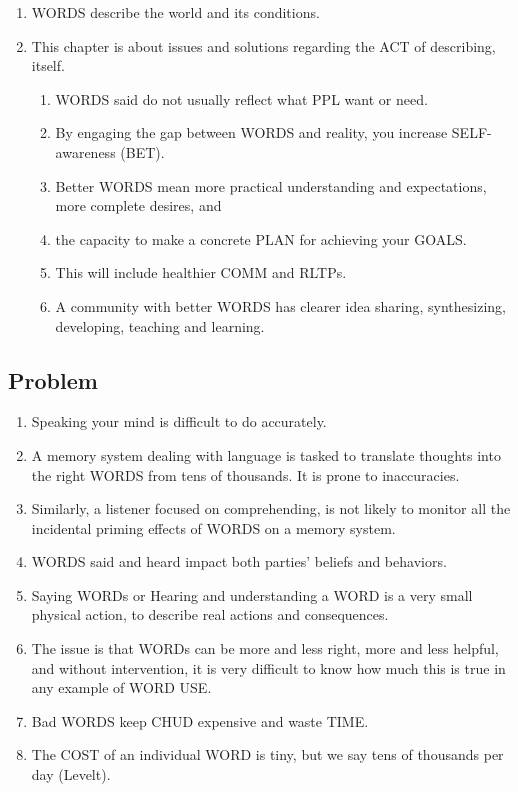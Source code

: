 \documentclass[
]{book}
\providecommand{\tightlist}{%
  \setlength{\itemsep}{0pt}\setlength{\parskip}{0pt}}
\begin{document}
\begin{enumerate}
\def\labelenumi{\arabic{enumi}.}
\tightlist
\item
  WORDS describe the world and its conditions.
\item
  This chapter is about issues and solutions regarding the ACT of describing, itself.

  \begin{enumerate}
  \def\labelenumii{\arabic{enumii}.}
  \tightlist
  \item
    WORDS said do not usually reflect what PPL want or need.
  \item
    By engaging the gap between WORDS and reality, you increase SELF-awareness (BET).
  \item
    Better WORDS mean more practical understanding and expectations, more complete desires, and
  \item
    the capacity to make a concrete PLAN for achieving your GOALS.
  \item
    This will include healthier COMM and RLTPs.
  \item
    A community with better WORDS has clearer idea sharing,
    synthesizing, developing, teaching and learning.
  \end{enumerate}
\end{enumerate}

\hypertarget{problem}{%
\subsection{Problem}\label{problem}}

\begin{enumerate}
\def\labelenumi{\arabic{enumi}.}
\setcounter{enumi}{10}
\tightlist
\item
  Speaking your mind is difficult to do accurately.
\item
  A memory system dealing with language is tasked to translate
  thoughts into the right WORDS from tens of thousands. It is prone to inaccuracies.
\item
  Similarly, a listener focused on comprehending, is not likely to monitor all the incidental priming effects of WORDS on a memory system.
\item
  WORDS said and heard impact both parties' beliefs and behaviors.
\item
  Saying WORDs or Hearing and understanding a WORD is a very small physical action, to describe real actions and consequences.
\item
  The issue is that WORDs can be more and less right, more and less helpful, and without intervention, it is very difficult to know how much this is true in any example of WORD USE.
\item
  Bad WORDS keep CHUD expensive and waste TIME.
\item
  The COST of an individual WORD is tiny, but we say tens of thousands per day (Levelt).
\end{enumerate}
\end{document}
